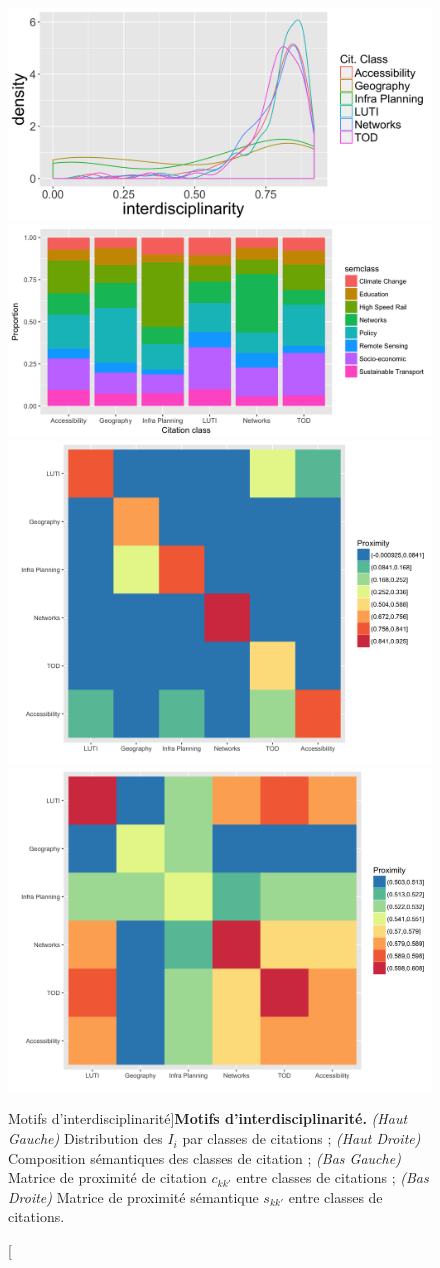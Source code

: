 \begin{figure}
\includegraphics[width=0.49\linewidth]{Figures/QuantEpistemo/interdisciplinarities}
\includegraphics[width=0.49\linewidth]{Figures/QuantEpistemo/compo_proportion}\\
\includegraphics[width=0.49\linewidth]{Figures/QuantEpistemo/citation_proximities}
\includegraphics[width=0.49\linewidth]{Figures/QuantEpistemo/semantic_proximities}
\caption[][Motifs d'interdisciplinarité]{}{\textbf{Motifs d'interdisciplinarité.} \textit{(Haut Gauche)} Distribution des $I_i$ par classes de citations ; \textit{(Haut Droite)} Composition sémantiques des classes de citation ; \textit{(Bas Gauche)} Matrice de proximité de citation $c_{kk'}$ entre classes de citations ; \textit{(Bas Droite)} Matrice de proximité sémantique $s_{kk'}$ entre classes de citations.}
\label{fig:quantepistemo:interdisc}
\end{figure}



